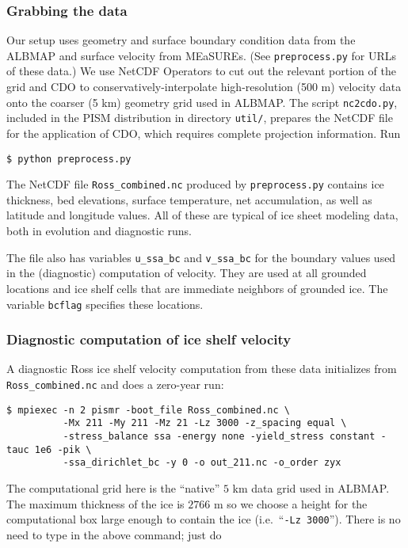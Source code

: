 \subsubsection*{Grabbing the data}

Our setup uses geometry and surface boundary condition data from the ALBMAP and surface velocity from MEaSUREs.  (See \texttt{preprocess.py} for URLs of these data.)  We use NetCDF Operators to cut out the relevant portion of the grid and CDO to conservatively-interpolate high-resolution (500 m) velocity data onto the coarser (5 km) geometry grid used in ALBMAP.  The script \texttt{nc2cdo.py}, included in the PISM distribution in directory \texttt{util/}, prepares the NetCDF file for the application of CDO, which requires complete projection information.  Run

\begin{verbatim}
$ python preprocess.py
\end{verbatim}%

The NetCDF file \texttt{Ross_combined.nc} produced by \texttt{preprocess.py} contains ice thickness, bed elevations, surface temperature, net accumulation, as well as latitude and longitude values.  All of these are typical of ice sheet modeling data, both in evolution and diagnostic runs.

The file also has variables \texttt{u_ssa_bc} and \texttt{v_ssa_bc} for the boundary values used in the (diagnostic) computation of velocity.  They are used at all grounded locations and ice shelf cells that are immediate neighbors of grounded ice.  The variable \texttt{bcflag} specifies these locations.


\subsubsection*{Diagnostic computation of ice shelf velocity}
A diagnostic Ross ice shelf velocity computation from these data initializes from \texttt{Ross_combined.nc} and does a zero-year run:

\begin{verbatim}
$ mpiexec -n 2 pismr -boot_file Ross_combined.nc \
          -Mx 211 -My 211 -Mz 21 -Lz 3000 -z_spacing equal \
          -stress_balance ssa -energy none -yield_stress constant -tauc 1e6 -pik \
          -ssa_dirichlet_bc -y 0 -o out_211.nc -o_order zyx
\end{verbatim}%
The computational grid here is the ``native'' $5$ km data grid used in ALBMAP.  The maximum thickness of the ice is $2766$ m so we choose a height for the computational box large enough to contain the ice (i.e.~``\texttt{-Lz 3000}'').  There is no need to type in the above command; just do

